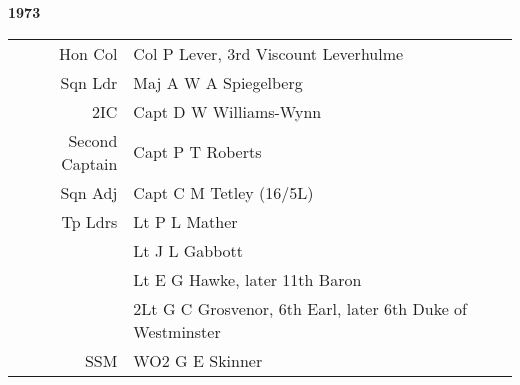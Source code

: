 \begin{center}
  \Huge
  \textbf{1973}
\end{center}

\begin{center}
  \small
  \begin{tabular}{rl}
    Hon Col & Col P Lever, 3rd Viscount Leverhulme \\
    Sqn Ldr & Maj A W A Spiegelberg \\
    2IC & Capt D W Williams-Wynn \\
    Second Captain & Capt P T Roberts \\
    Sqn Adj & Capt C M Tetley (16/5L) \\
    Tp Ldrs & Lt P L Mather \\
      & Lt J L Gabbott \\
      & Lt E G Hawke, later 11th Baron \\
      & 2Lt G C Grosvenor, 6th Earl, later 6th Duke of Westminster \\
    SSM & WO2 G E Skinner \\
  \end{tabular}
\end{center}

